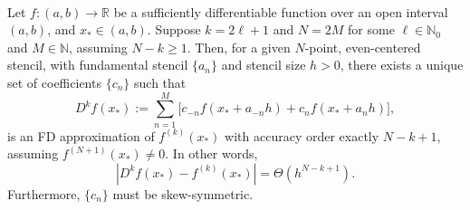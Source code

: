 \documentclass[12pt]{article}
\newcommand{\N}{\mathbb{N}}
\newcommand{\R}{\mathbb{R}}
\newcommand{\xstar}{x_*}
\newcommand{\FD}{D}
\begin{document}
%
\begin{theorem} \label{thm:SCodd}
\\
Let $f:(a,b)\to\R$ be a sufficiently differentiable function over an open interval $(a,b)$, and $\xstar\in (a,b)$.
Suppose $k=2\ell+1$ and $N=2M$ for some $\ell\in\N_0$ and $M\in\N$, assuming $N-k\ge 1$.
Then, for a given $N$-point, even-centered stencil, with fundamental stencil $\{a_n\}$ and stencil size $h>0$, there exists a unique set of coefficients $\{c_n\}$ such that 
\[
	\FD^k f(\xstar) := \sum_{n=1}^M\Big[ c_{-n}f(\xstar+a_{-n}h)+c_nf(\xstar+a_nh) \Big],
\]
is an FD approximation of $f^{(k)}(\xstar)$ with accuracy order exactly $N-k+1$, assuming $f^{(N+1)}(\xstar)\neq 0$.
In other words, 
\[
	\left| \FD^k f(\xstar) - f^{(k)}(\xstar) \right| = \Theta(h^{N-k+1}).
\]
Furthermore, $\{c_n\}$ must be skew-symmetric.
\end{theorem}
%
\end{document}
